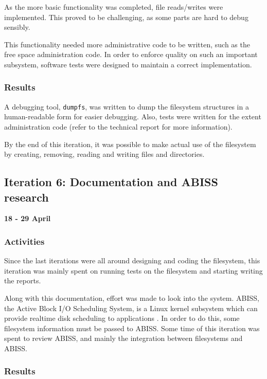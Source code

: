 As the more basic functionality was completed, file reads/writes were implemented. This proved to be challenging, as some parts are hard to debug sensibly.

This functionality needed more administrative code to be written, such as the free space administration code. In order to enforce quality on such an important subsystem, software tests were designed to maintain a correct implementation.

\subsubsection{Results}

A debugging tool, \texttt{dumpfs}, was written to dump the filesystem structures in a human-readable form for easier debugging. Also, tests were written for the extent administration code (refer to the technical report for more information).

By the end of this iteration, it was possible to make actual use of the filesystem by creating, removing, reading and writing files and directories.

\subsection{Iteration 6: Documentation and ABISS research}

\textbf{18 - 29 April}

\subsubsection{Activities}

Since the last iterations were all around designing and coding the filesystem, this iteration was mainly spent on running tests on the filesystem and starting writing the reports.

Along with this documentation, effort was made to look into the  system. ABISS, the Active Block I/O Scheduling System, is a Linux kernel subsystem which can provide realtime disk scheduling to applications \cite{ABISS}. In order to do this, some filesystem information must be passed to ABISS. Some time of this iteration was spent to review ABISS, and mainly the integration between filesystems and ABISS.

\subsubsection{Results}

